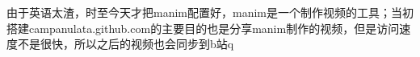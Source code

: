 \documentclass[preview]{standalone}
\begin{document}
\centering 由于英语太渣，时至今天才把manim配置好，manim是一个制作视频的工具；当初搭建campanulata.github.com的主要目的也是分享manim制作的视频，但是访问速度不是很快，所以之后的视频也会同步到b站q
\end{document}
